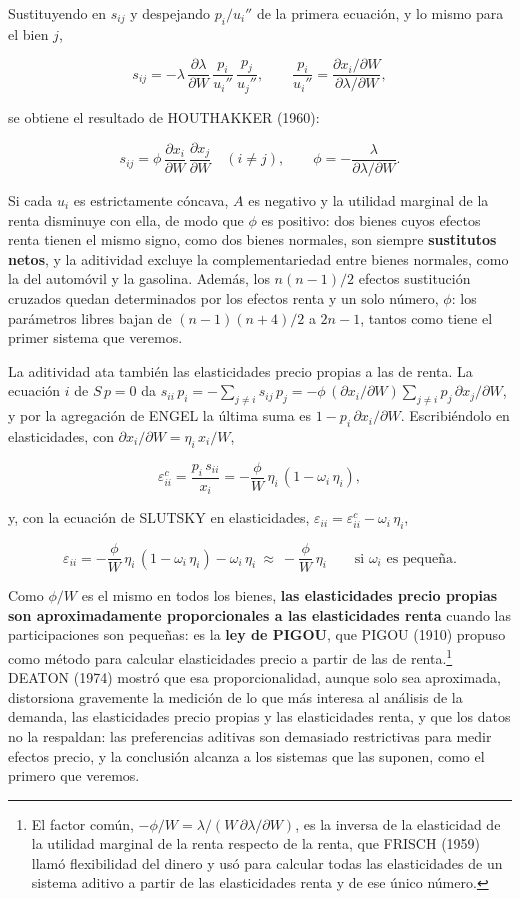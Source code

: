 \documentclass[10pt,a4paper]{article}
\begin{document}
Sustituyendo en $s_{ij}$ y despejando $p_i/u_i''$ de la primera ecuación, y lo mismo para el bien $j$,

$$s_{ij}=-\lambda\,\frac{\partial\lambda}{\partial W}\,\frac{p_i}{u_i''}\,\frac{p_j}{u_j''},\qquad \frac{p_i}{u_i''}=\frac{\partial x_i/\partial W}{\partial\lambda/\partial W},$$

se obtiene el resultado de HOUTHAKKER (1960):

$$s_{ij}=\phi\,\frac{\partial x_i}{\partial W}\,\frac{\partial x_j}{\partial W}\quad(i\neq j),\qquad \phi=-\frac{\lambda}{\partial\lambda/\partial W}.$$

Si cada $u_i$ es estrictamente cóncava, $A$ es negativo y la utilidad marginal de la renta disminuye con ella, de modo que $\phi$ es positivo: dos bienes cuyos efectos renta tienen el mismo signo, como dos bienes normales, son siempre \textbf{sustitutos netos}, y la aditividad excluye la complementariedad entre bienes normales, como la del automóvil y la gasolina. Además, los $n(n-1)/2$ efectos sustitución cruzados quedan determinados por los efectos renta y un solo número, $\phi$: los parámetros libres bajan de $(n-1)(n+4)/2$ a $2n-1$, tantos como tiene el primer sistema que veremos.

La aditividad ata también las elasticidades precio propias a las de renta. La ecuación $i$ de $S\,p=0$ da $s_{ii}\,p_i=-\sum_{j\ne i}s_{ij}\,p_j=-\phi\,(\partial x_i/\partial W)\sum_{j\ne i}p_j\,\partial x_j/\partial W$, y por la agregación de ENGEL la última suma es $1-p_i\,\partial x_i/\partial W$. Escribiéndolo en elasticidades, con $\partial x_i/\partial W=\eta_i\,x_i/W$,

$$\varepsilon^c_{ii}=\frac{p_i\,s_{ii}}{x_i}=-\frac{\phi}{W}\,\eta_i\,(1-\omega_i\,\eta_i),$$

y, con la ecuación de SLUTSKY en elasticidades, $\varepsilon_{ii}=\varepsilon^c_{ii}-\omega_i\,\eta_i$,

$$\varepsilon_{ii}=-\frac{\phi}{W}\,\eta_i\,(1-\omega_i\,\eta_i)-\omega_i\,\eta_i\ \approx\ -\frac{\phi}{W}\,\eta_i\qquad\text{si }\omega_i\text{ es pequeña}.$$

Como $\phi/W$ es el mismo en todos los bienes, \textbf{las elasticidades precio propias son aproximadamente proporcionales a las elasticidades renta} cuando las participaciones son pequeñas: es la \textbf{ley de PIGOU}, que PIGOU (1910) propuso como método para calcular elasticidades precio a partir de las de renta.\footnote{%
    El factor común, $-\phi/W=\lambda/(W\,\partial\lambda/\partial W)$, es la inversa de la elasticidad de la utilidad marginal de la renta respecto de la renta, que FRISCH (1959) llamó flexibilidad del dinero y usó para calcular todas las elasticidades de un sistema aditivo a partir de las elasticidades renta y de ese único número.
} DEATON (1974) mostró que esa proporcionalidad, aunque solo sea aproximada, distorsiona gravemente la medición de lo que más interesa al análisis de la demanda, las elasticidades precio propias y las elasticidades renta, y que los datos no la respaldan: las preferencias aditivas son demasiado restrictivas para medir efectos precio, y la conclusión alcanza a los sistemas que las suponen, como el primero que veremos.
\end{document}
